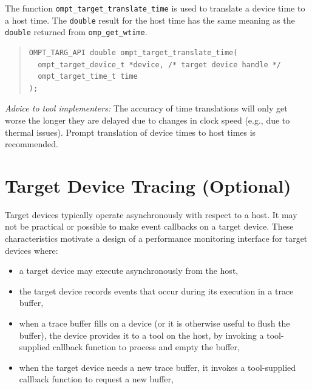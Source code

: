 \documentclass{article}
\begin{document}
The function \verb|ompt_target_translate_time| is used to translate a device time to a host time. The {\tt double} result for the host time has the same meaning as the {\tt double} returned from \verb|omp_get_wtime|.
\begin{quote}
\begin{verbatim}
OMPT_TARG_API double ompt_target_translate_time(
  ompt_target_device_t *device, /* target device handle */
  ompt_target_time_t time
);
\end{verbatim}
\end{quote}
\noindent
{\em Advice to tool implementers:} The accuracy of time translations will only get worse the longer they are delayed due to changes in clock speed (e.g., due to thermal issues). Prompt translation of device times to host times is recommended.

\section{Target Device Tracing (Optional)}
\label{sec:target-device-records}

Target devices typically operate asynchronously with respect to a host. It may not be practical or possible to make event callbacks on a target device. These characteristics motivate a design of a performance monitoring interface for target devices where: 
\begin{itemize}
\item a target device may execute asynchronously from the host,
\item the target device records events that occur during its execution in a trace buffer,
\item when a trace buffer fills on a device (or it is otherwise useful to flush the buffer),  the device provides it to a tool on the host, by invoking a tool-supplied callback function to process and empty the buffer,
\item when the target device needs a new trace buffer, it invokes a tool-supplied callback function to request a new buffer,
\end{itemize}
\end{document}
